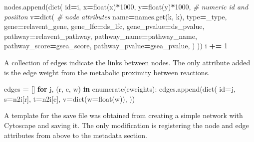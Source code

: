 \documentclass[
]{book}
\newenvironment{Shaded}{\begin{snugshade}}{\end{snugshade}}
\newcommand{\BuiltInTok}[1]{#1}
\newcommand{\CommentTok}[1]{\textcolor[rgb]{0.56,0.35,0.01}{\textit{#1}}}
\newcommand{\ControlFlowTok}[1]{\textcolor[rgb]{0.13,0.29,0.53}{\textbf{#1}}}
\newcommand{\DecValTok}[1]{\textcolor[rgb]{0.00,0.00,0.81}{#1}}
\newcommand{\KeywordTok}[1]{\textcolor[rgb]{0.13,0.29,0.53}{\textbf{#1}}}
\newcommand{\NormalTok}[1]{#1}
\newcommand{\OperatorTok}[1]{\textcolor[rgb]{0.81,0.36,0.00}{\textbf{#1}}}
\begin{document}
\begin{Shaded}
\begin{Highlighting}[numbers=left,,]
\NormalTok{        nodes.append(}\BuiltInTok{dict}\NormalTok{(}
            \BuiltInTok{id}\OperatorTok{=}\NormalTok{i, x}\OperatorTok{=}\BuiltInTok{float}\NormalTok{(x)}\OperatorTok{*}\DecValTok{1000}\NormalTok{, y}\OperatorTok{=}\BuiltInTok{float}\NormalTok{(y)}\OperatorTok{*}\DecValTok{1000}\NormalTok{, }\CommentTok{\# numeric id and posiiton}
\NormalTok{            v}\OperatorTok{=}\BuiltInTok{dict}\NormalTok{( }\CommentTok{\# node attributes}
\NormalTok{                name}\OperatorTok{=}\NormalTok{names.get(k, k),}
                \BuiltInTok{type}\OperatorTok{=}\NormalTok{\_type,}
\NormalTok{                gene}\OperatorTok{=}\NormalTok{relavent\_gene,}
\NormalTok{                gene\_lfc}\OperatorTok{=}\NormalTok{ds\_lfc,}
\NormalTok{                gene\_pvalue}\OperatorTok{=}\NormalTok{ds\_pvalue,}
\NormalTok{                pathway}\OperatorTok{=}\NormalTok{relavent\_pathway,}
\NormalTok{                pathway\_name}\OperatorTok{=}\NormalTok{pathway\_name,}
\NormalTok{                pathway\_score}\OperatorTok{=}\NormalTok{gsea\_score,}
\NormalTok{                pathway\_pvalue}\OperatorTok{=}\NormalTok{gsea\_pvalue,}
\NormalTok{            )}
\NormalTok{        ))}
\NormalTok{        i }\OperatorTok{+=} \DecValTok{1}
\end{Highlighting}
\end{Shaded}

A collection of edges indicate the links between nodes. The only attribute added is the edge weight from the metabolic proximity between reactions.

\begin{Shaded}
\begin{Highlighting}[numbers=left,,]
\NormalTok{edges }\OperatorTok{=}\NormalTok{ []}
\ControlFlowTok{for}\NormalTok{ j, (r, c, w) }\KeywordTok{in} \BuiltInTok{enumerate}\NormalTok{(eweights):}
\NormalTok{    edges.append(}\BuiltInTok{dict}\NormalTok{(}
        \BuiltInTok{id}\OperatorTok{=}\NormalTok{j, s}\OperatorTok{=}\NormalTok{n2i[r], t}\OperatorTok{=}\NormalTok{n2i[c],}
\NormalTok{        v}\OperatorTok{=}\BuiltInTok{dict}\NormalTok{(w}\OperatorTok{=}\BuiltInTok{float}\NormalTok{(w)),}
\NormalTok{    ))}
\end{Highlighting}
\end{Shaded}

A template for the save file was obtained from creating a simple network with Cytoscape and saving it.
The only modification is registering the node and edge attributes from above to the metadata section.
\end{document}

